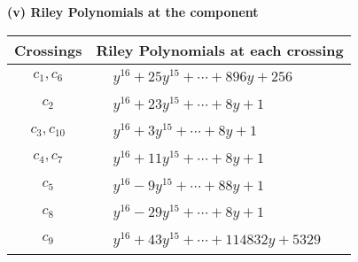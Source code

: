 \documentclass[1p]{elsarticle_modified}
\theoremstyle{definition}
\begin{document}
\newpage\renewcommand{\arraystretch}{1}
\flushleft \textbf{(v) Riley Polynomials at the component}\newline \\
\begin{tabular}{m{50pt}|m{274pt}}
Crossings & \hspace{64pt}Riley Polynomials at each crossing \\
\hline $$\begin{aligned}c_{1},c_{6}\end{aligned}$$&$\begin{aligned}
&y^{16}+25 y^{15}+\cdots+896 y+256
\end{aligned}$\\
\hline $$\begin{aligned}c_{2}\end{aligned}$$&$\begin{aligned}
&y^{16}+23 y^{15}+\cdots+8 y+1
\end{aligned}$\\
\hline $$\begin{aligned}c_{3},c_{10}\end{aligned}$$&$\begin{aligned}
&y^{16}+3 y^{15}+\cdots+8 y+1
\end{aligned}$\\
\hline $$\begin{aligned}c_{4},c_{7}\end{aligned}$$&$\begin{aligned}
&y^{16}+11 y^{15}+\cdots+8 y+1
\end{aligned}$\\
\hline $$\begin{aligned}c_{5}\end{aligned}$$&$\begin{aligned}
&y^{16}-9 y^{15}+\cdots+88 y+1
\end{aligned}$\\
\hline $$\begin{aligned}c_{8}\end{aligned}$$&$\begin{aligned}
&y^{16}-29 y^{15}+\cdots+8 y+1
\end{aligned}$\\
\hline $$\begin{aligned}c_{9}\end{aligned}$$&$\begin{aligned}
&y^{16}+43 y^{15}+\cdots+114832 y+5329
\end{aligned}$\\
\hline
\end{tabular}\\~\\
\end{document}
